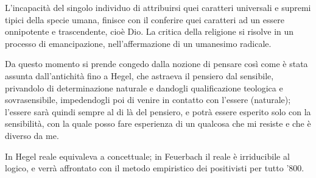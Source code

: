 L'incapacità del singolo individuo di attribuirsi quei caratteri universali e supremi tipici della specie umana, finisce con il conferire quei caratteri ad un essere onnipotente e trascendente, cioè Dio. La critica della religione si risolve in un processo di emancipazione, nell'affermazione di un umanesimo radicale.

Da questo momento si prende congedo dalla nozione di pensare così come è stata assunta dall'antichità fino a Hegel, che astraeva il pensiero dal sensibile, privandolo di determinazione naturale e dandogli qualificazione teologica e sovrasensibile, impedendogli poi di venire in contatto con l'essere (naturale); l'essere sarà quindi sempre al di là del pensiero, e potrà essere esperito solo con la sensibilità, con la quale posso fare esperienza di un qualcosa che mi resiste e che è diverso da me.

In Hegel reale equivaleva a concettuale; in Feuerbach il reale è irriducibile al logico, e verrà affrontato con il metodo empiristico dei positivisti per tutto '800.

